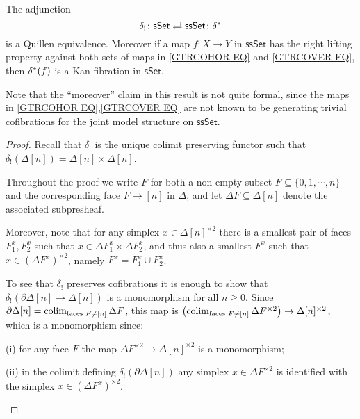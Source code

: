 \documentclass[a4paper,10pt
,draft
]{article}%
\begin{document}
\begin{corollary}\label{SSETSSETADJ COR}
	The adjunction
\[
	\delta_{!}\colon \mathsf{sSet} 
		\rightleftarrows 
	\mathsf{ssSet} \colon \delta^{\**}
\]
is a Quillen equivalence.
Moreover if a map $f\colon X \to Y$ in $\mathsf{ssSet}$ has the right lifting property
against both sets of maps in
\eqref{GTRCOHOR EQ} and \eqref{GTRCOVER EQ}, then
$\delta^{\**} (f)$ is a Kan fibration in $\mathsf{sSet}$.
\end{corollary}

Note that the ``moreover'' claim in this result is not quite formal, since the maps in \eqref{GTRCOHOR EQ},\eqref{GTRCOVER EQ} are not known to be generating trivial cofibrations for the joint model structure on $\mathsf{ssSet}$.


\begin{proof}
	Recall that $\delta_!$ is the unique colimit preserving functor such that 
	$\delta_!(\Delta[n])=\Delta[n] \times \Delta[n]$.

Throughout the proof we write $F$ for both a non-empty subset $F \subseteq \{0,1,\cdots,n\}$ and the corresponding face $F \to [n]$ in $\Delta$, and let $\Delta F \subseteq \Delta[n]$ denote the associated subpresheaf. 


Moreover, note that for any simplex
$x \in \Delta[n]^{\times 2}$ there is a smallest pair of faces
$F_1^x, F_2^x$ such that
$x \in \Delta F_1^x \times \Delta F_2^x$, and thus also a smallest 
$F^x$ such that $x \in (\Delta F^x)^{\times 2}$,
namely $F^x = F^x_1 \cup F^x_2$.


	To see that $\delta_!$ preserves cofibrations 
	it is enough to show that 
	$\delta_{!}\left( \partial \Delta[n] \to \Delta[n]\right)$
	is a monomorphism for all $n\geq 0$.
	Since
	$\partial \Delta[n] = \mathop{\operatorname{colim}}_{\text{faces }F \neq [n]}\Delta F$, this map is
	$\left(\mathop{\operatorname{colim}}_{\text{faces }F \neq [n]}\Delta F^{\times 2}\right) \to \Delta[n]^{\times 2}$, which is a monomorphism since:
\begin{inparaenum}
	\item[(i)] for any face $F$ the map $\Delta F^{\times 2} \to \Delta[n]^{\times 2}$ is a monomorphism;
	\item[(ii)] in the colimit defining $\delta_{!} \left(\partial \Delta[n]\right)$ any simplex $x \in \Delta F^{\times 2}$ is identified with the simplex $x \in (\Delta F^x)^{\times 2}$.
\end{inparaenum}




\end{proof}
\end{document}
